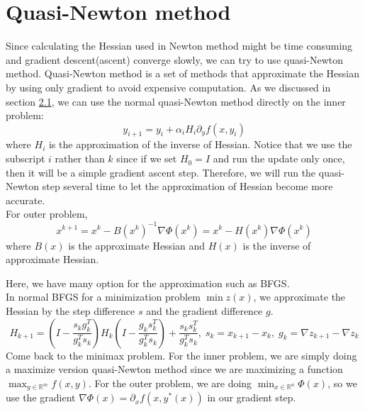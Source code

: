 \documentclass{article}
\begin{document}
\section{Quasi-Newton method}
Since calculating the Hessian used in Newton method might be time consuming and gradient descent(ascent) converge slowly,
we can try to use quasi-Newton method.
Quasi-Newton method is a set of methods that approximate the Hessian by using only gradient to avoid expensive computation.
As we discussed in section \hyperref[InnerProblem]{2.1}, we can use the normal quasi-Newton method directly on the inner problem:
\begin{equation}
    y_{i+1} = y_i + \alpha_i H_i \partial_y f(x, y_i)
\end{equation}
where $H_i$ is the approximation of the inverse of Hessian. Notice that we use the subscript $i$ rather than $k$ since if we set $H_0 = I$ and run the update only once, then it will be a simple gradient ascent step.
Therefore, we will run the quasi-Newton step several time to let the approximation of Hessian become more accurate.\\
For outer problem, 
\begin{equation}
    x^{k+1} = x^k - B(x^k)^{-1}\nabla\Phi(x^k) = x^k - H(x^k)\nabla\Phi(x^k)
\end{equation}
where $B(x)$ is the approximate Hessian and $H(x)$ is the inverse of approximate Hessian.

Here, we have many option for the approximation such as BFGS.\\
In normal BFGS for a minimization problem $\min z(x)$, we approximate the Hessian by the step difference $s$ and the gradient difference $g$.
\begin{equation}
    H_{k+1} = (I - \frac{s_k g_k^T}{g_k^T s_k})H_k(I - \frac{g_k s_k^T}{g_k^T s_k}) + \frac{s_k s_k^T}{g_k^T s_k},\; s_k = x_{k+1} - x_k,\; g_k = \nabla z_{k+1} - \nabla z_k
\end{equation}
Come back to the minimax problem. For the inner problem, we are simply doing a maximize version quasi-Newton method since we are maximizing a function $\max_{y \in \mathbb{R}^m} f(x,y)$.
For the outer problem, we are doing $\min_{x \in \mathbb{R}^n} \Phi(x)$, so we use the gradient $\nabla\Phi(x) = \partial_xf(x, y^*(x))$ in our gradient step.
\end{document}
